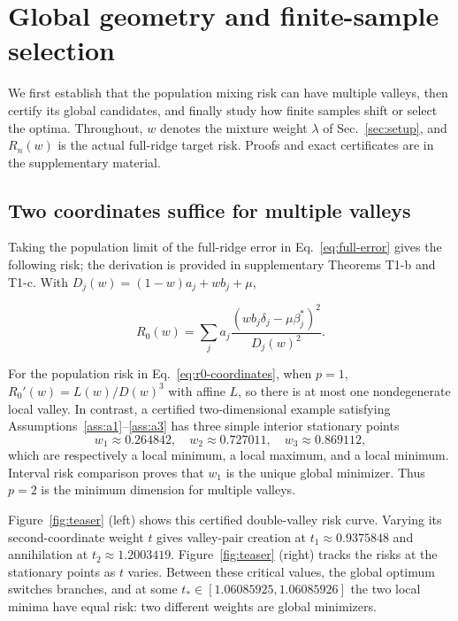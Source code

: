 \section{Global geometry and finite-sample selection}
\label{sec:theory}

We first establish that the population mixing risk can have multiple valleys, then certify its global candidates, and finally study how finite samples shift or select the optima. Throughout, $w$ denotes the mixture weight $\lambda$ of Sec.~\ref{sec:setup}, and $R_n(w)$ is the actual full-ridge target risk. Proofs and exact certificates are in the supplementary material.

\subsection{Two coordinates suffice for multiple valleys}
\label{sec:population-geometry}

Taking the population limit of the full-ridge error in Eq.~\eqref{eq:full-error} gives the following risk; the derivation is provided in supplementary Theorems T1-b and T1-c. With $D_j(w)=(1-w)a_j+wb_j+\mu$,

\begin{equation}
 R_0(w)=\sum_j a_j\frac{(wb_j\delta_j-\mu\beta_j^*)^2}{D_j(w)^2}.
 \label{eq:r0-coordinates}
\end{equation}

\begin{proposition}\label{prop:multimodal}
For the population risk in Eq.~\eqref{eq:r0-coordinates}, when $p=1$, $R_0'(w)=L(w)/D(w)^3$ with affine $L$, so there is at most one nondegenerate local valley. In contrast, a certified two-dimensional example satisfying Assumptions~\ref{ass:a1}--\ref{ass:a3} has three simple interior stationary points
\begin{equation}
 w_1\approx0.264842,\quad w_2\approx0.727011,\quad w_3\approx0.869112,
\end{equation}
which are respectively a local minimum, a local maximum, and a local minimum. Interval risk comparison proves that $w_1$ is the unique global minimizer. Thus $p=2$ is the minimum dimension for multiple valleys.
\end{proposition}

Figure~\ref{fig:teaser} (left) shows this certified double-valley risk curve. Varying its second-coordinate weight $t$ gives valley-pair creation at $t_1\approx0.9375848$ and annihilation at $t_2\approx1.2003419$. Figure~\ref{fig:teaser} (right) tracks the risks at the stationary points as $t$ varies. Between these critical values, the global optimum switches branches, and at some $t_*\in[1.06085925,1.06085926]$ the two local minima have equal risk: two different weights are global minimizers.

